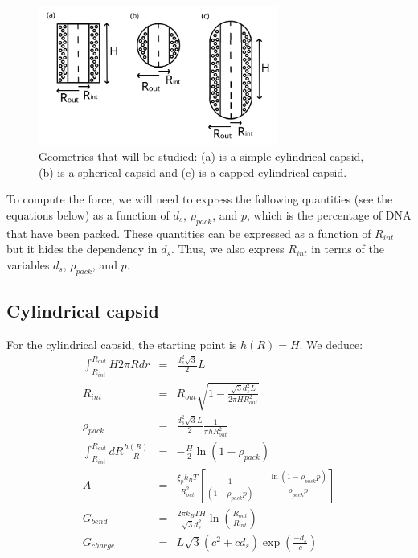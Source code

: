 \documentclass{article}
\begin{document}
\begin{figure}[H]
    \centering
    \includegraphics[width=0.7\textwidth]{analitical_geometries.png}
    \caption{Geometries that will be studied: (a) is a simple cylindrical capsid, (b) is a spherical capsid and (c) is a capped cylindrical capsid.}
    \label{fig:shapes}
\end{figure}

To compute the force, we will need to express the following quantities (see the equations below) as a function of $d_s$, $\rho_{pack}$, and $p$, which is the percentage of DNA that have been packed. These quantities can be expressed as a function of $R_{int}$ but it hides the dependency in $d_s$. Thus, we also express $R_{int}$ in terms of the variables $d_s$, $\rho_{pack}$, and $p$.

\subsection{Cylindrical capsid}

For the cylindrical capsid, the starting point is $h(R) = H$.
We deduce:
\begin{eqnarray}
    \int_{R_{int}}^{R_{out}} H 2 \pi R dr &=& \frac{d_s^2 \sqrt{3}}{2}L \\
    R_{int} &=& R_{out} \sqrt{1 - \frac{\sqrt{3}d_s^2L}{2 \pi H R_{out}^2}} \\
    \rho_{pack} &=& \frac{d_s^2 \sqrt{3} L}{2} \frac{1}{\pi h R_{out}^2} \\
    \int_{R_{int}}^{R_{out}} dR \frac{h(R)}{R} & = & -\frac{H}{2} \ln \left( 1-\rho_{pack}\right) \\
    A & = &\frac{\xi_p k_B T}{R_{out}^2} \left[ \frac{1}{ \left( 1 - \rho_{pack} p\right)} - \frac{\ln \left( 1-\rho_{pack}p \right) }{\rho_{pack} p} \right] \\
    G_{bend} &=& \frac{2 \pi k_B T H}{\sqrt{3} d_s^2} \ln \left( \frac{R_{out}}{R_{int}} \right) \\
    G_{charge} &=& L \sqrt{3} \left( c^2 + c d_s \right) \exp \left( \frac{-d_s}{c} \right)
\end{eqnarray}
\end{document}
